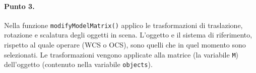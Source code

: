 \documentclass[a4paper, 12pt]{article}
\begin{document}
\paragraph{Punto 3.}
Nella funzione \texttt{modifyModelMatrix()} applico le trasformazioni di traslazione, rotazione e scalatura degli oggetti in scena. L'oggetto e il sistema di riferimento, rispetto al quale operare (WCS o OCS), sono quelli che in quel momento sono selezionati. Le trasformazioni vengono applicate alla matrice (la variabile \texttt{M}) dell'oggetto (contenuto nella variabile \texttt{objects}).


\end{document}
